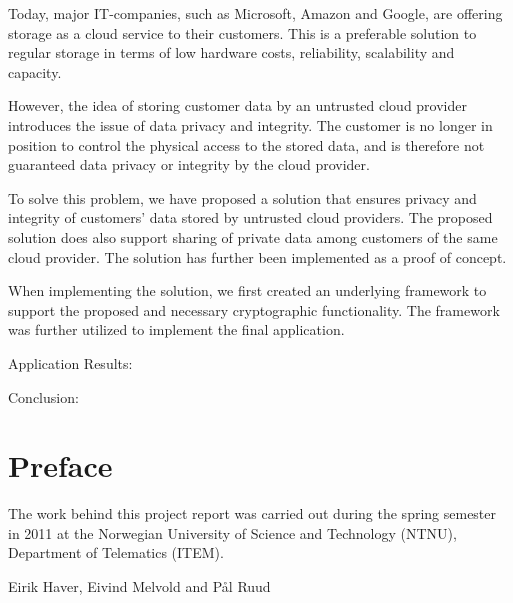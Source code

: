 \documentclass[pdftex,english,10pt,b5paper,twoside]{book}
\begin{document}
Today, major IT-companies, such as Microsoft, Amazon and Google, are offering
storage as a cloud service to their customers. This is a preferable solution to
regular storage in terms of low hardware costs, reliability, scalability and capacity.

However, the idea of storing customer data by an untrusted cloud provider
introduces the issue of data privacy and integrity. The customer is no longer in
position to control the physical access to the stored data, and is therefore
not guaranteed data privacy or integrity by the cloud provider.

To solve this problem, we have proposed a solution that ensures
privacy and integrity of customers' data stored by untrusted cloud providers.
The proposed solution does also support sharing of private data among customers
of the same cloud provider. The solution has further been implemented as a proof of concept.

When implementing the solution, we first created an underlying framework to support the
proposed and necessary cryptographic functionality. The framework was further
utilized to implement the final application.

Application Results:

Conclusion:


\chapter*{Preface}

The work behind this project report was carried out during the spring semester
in 2011 at the Norwegian University of Science and Technology (NTNU), Department
of Telematics (ITEM).
\vspace{13pt}

\begin{center}
Eirik Haver, Eivind Melvold and Pål Ruud
\vspace{13pt}

\end{center}

\tableofcontents

\cleardoublepage
{}
{}
\listoffigures

\cleardoublepage
{}
{}
\listoftables

\cleardoublepage
{}
{}
\lstlistoflistings
\cleardoublepage
\end{document}
